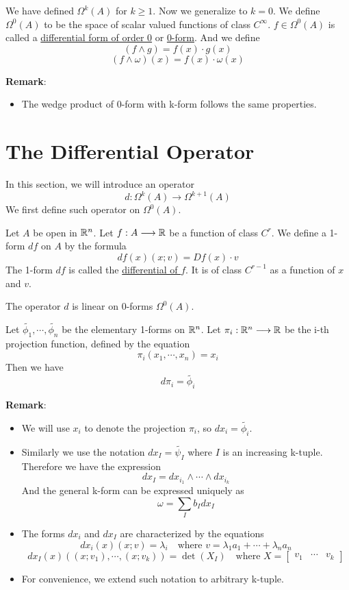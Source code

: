 \begin{definition}
    We have defined $\Omega^k(A)$ for $k\geq1$. Now we generalize to $k=0$. We define $\Omega^0(A)$ to be the space of scalar valued functions of class $C^{\infty}$. $f\in\Omega^0(A)$ is called a \underline{differential form of order 0} or \underline{0-form}. 
    And we define $$(f\wedge g)=f(x)\cdot g(x)$$ $$(f\wedge \omega)(x)=f(x)\cdot \omega(x)$$
\end{definition}
\noindent\textbf{Remark}:
\begin{itemize}
    \item The wedge product of 0-form with k-form follows the same properties.
\end{itemize}

\section{The Differential Operator}
In this section, we will introduce an operator $$d:\Omega^k(A)\longrightarrow\Omega^{k+1}(A)$$
We first define such operator on $\Omega^0(A)$.

\begin{definition}
    Let $A$ be open in $\mathbb{R}^n$. Let $f:A\longrightarrow\mathbb{R}$ be a function of class $C^r$. We define a 1-form $df$ on $A$ by the formula $$df(x)(x;v)=Df(x)\cdot v$$
    The 1-form $df$ is called the \underline{differential of $f$}. It is of class $C^{r-1}$ as a function of $x$ and $v$.
\end{definition}

\begin{theorem}
    The operator $d$ is linear on 0-forms $\Omega^0(A)$.
\end{theorem}

\begin{lemma}
    Let $\tilde{\phi_1},\cdots,\tilde{\phi_n}$ be the elementary 1-forms on $\mathbb{R}^n$. Let $\pi_i:\mathbb{R}^n\longrightarrow\mathbb{R}$ be the i-th projection function, defined by the equation $$\pi_i(x_1,\cdots,x_n)=x_i$$
    Then we have $$d\pi_i=\tilde{\phi_i}$$
\end{lemma}
\noindent\textbf{Remark}:
\begin{itemize}
    \item We will use $x_i$ to denote the projection $\pi_i$, so $dx_i=\tilde{\phi_i}$.
    \item Similarly we use the notation $dx_I=\tilde{\psi_I}$ where $I$ is an increasing k-tuple. Therefore we have the expression $$dx_I=dx_{i_1}\wedge\cdots\wedge dx_{i_k}$$
    And the general k-form can be expressed uniquely as $$\omega=\sum_Ib_Idx_I$$
    \item The forms $dx_i$ and $dx_I$ are characterized by the equations 
    $$dx_i(x)(x;v)=\lambda_i \quad \text{where }v=\lambda_1a_1+\cdots+\lambda_na_n$$
    $$dx_I(x)((x;v_1),\cdots,(x;v_k))=\det(X_I) \quad \text{where } X=\begin{bmatrix}
        v_1 & \cdots & v_k
    \end{bmatrix}$$
    \item For convenience, we extend such notation to arbitrary k-tuple.
\end{itemize}

